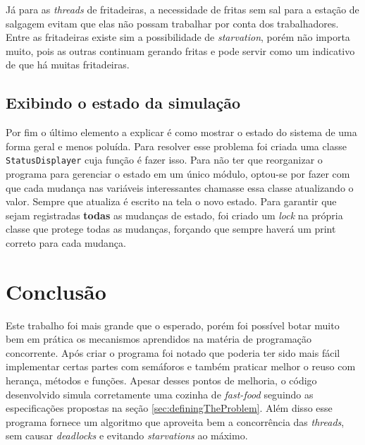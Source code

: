 \documentclass[a4paper]{article}
\begin{document}
Já para as \textit{threads} de fritadeiras, a necessidade de fritas sem sal para a estação de salgagem evitam que elas não possam trabalhar por conta dos trabalhadores. Entre as fritadeiras existe sim a possibilidade de \textit{starvation}, porém não importa muito, pois as outras continuam gerando fritas e pode servir como um indicativo de que há muitas fritadeiras.

\subsection{Exibindo o estado da simulação}
\label{sec:showProgramState}

Por fim o último elemento a explicar é como mostrar o estado do sistema de uma forma geral e menos poluída. Para resolver esse problema foi criada uma classe \texttt{StatusDisplayer} cuja função é fazer isso. Para não ter que reorganizar o programa para gerenciar o estado em um único módulo, optou-se por fazer com que cada mudança nas variáveis interessantes chamasse essa classe atualizando o valor. Sempre que atualiza é escrito na tela o novo estado. Para garantir que sejam registradas \textbf{todas} as mudanças de estado, foi criado um \textit{lock} na própria classe que protege todas as mudanças, forçando que sempre haverá um print correto para cada mudança.

\section{Conclusão}

Este trabalho foi mais grande que o esperado, porém foi possível botar muito bem em prática os mecanismos aprendidos na matéria de programação concorrente. Após criar o programa foi notado que poderia ter sido mais fácil implementar certas partes com semáforos e também praticar melhor o reuso com herança, métodos e funções. Apesar desses pontos de melhoria, o código desenvolvido simula corretamente uma cozinha de \textit{fast-food} seguindo as especificações propostas na seção \ref{sec:definingTheProblem}. Além disso esse programa fornece um algoritmo que aproveita bem a concorrência das \textit{threads}, sem causar \textit{deadlocks} e evitando \textit{starvations} ao máximo.

\nocite{costa}
\nocite{cppreference.com}
\nocite{blaise_barney}
\printbibliography
\end{document}
